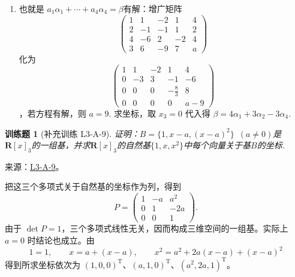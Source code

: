 \documentclass[12pt,fontset=fandol]{ctexart}
\newtheorem{exercise}{训练题}[section]
\begin{document}
\begin{solve}
\begin{enumerate}
                \item 也就是 $a_1\alpha_1+\cdots+a_4\alpha_4=\beta$有解：增广矩阵 
\[\begin{pmatrix}
                              1 & 1  & -2 & 1  & 4 \\
                              2 & -1 & -1 & 1  & 2 \\
                              4 & -6 & 2  & -2 & 4 \\
                              3 & 6  & -9 & 7  & a\end{pmatrix}\]
化为 
\[\begin{pmatrix}
                              1 & 1  & -2 & 1         & 4   \\
                              0 & -3 & 3  & -1        & -6  \\
                              0 & 0  & 0  & -\frac 83 & 8   \\
                              0 & 0  & 0  & 0         & a-9\end{pmatrix}\]
，若方程有解，则 $a=9$. 求坐标，取 $x_3=0$ 代入得 $\beta=4\alpha_1+3\alpha_2-3\alpha_4$.
            \end{enumerate}
\end{solve}

\begin{exercise}[补充训练 L3-A-9]\label{prob:L3-A-9}
证明：$B=\{1,x-a,(x-a)^2\}\enspace(a\neq 0)$是$\mathbf{R}[x]_3$的一组基，并求$\mathbf{R}[x]_3$的自然基$\{1,x,x^2\}$中每个向量关于基$B$的坐标.
\end{exercise}
\noindent 来源：\href{https://github.com/yhwu-is/Linear-Algebra-Left-Undone/blob/new/%E8%AE%B2%E4%B9%89/%E4%B8%93%E9%A2%98/3%20%E6%9C%89%E9%99%90%E7%BB%B4%E7%BA%BF%E6%80%A7%E7%A9%BA%E9%97%B4.tex}{L3-A-9}。
\begin{solve}
把这三个多项式关于自然基的坐标作为列，得到
\[P=\begin{pmatrix}1&-a&a^2\\0&1&-2a\\0&0&1\end{pmatrix}.\]
由于 $\det P=1$，三个多项式线性无关，因而构成三维空间的一组基。实际上 $a=0$ 时结论也成立。由
\[1=1,\qquad x=a+(x-a),\qquad x^2=a^2+2a(x-a)+(x-a)^2\]
得到所求坐标依次为 $(1,0,0)^{\mathrm T}$、$(a,1,0)^{\mathrm T}$、$(a^2,2a,1)^{\mathrm T}$。
\end{solve}
\end{document}
